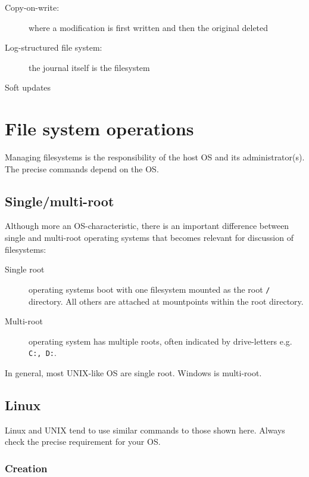 \begin{description}
\item[Copy-on-write:]
where a modification is first written and then the original deleted
\item[Log-structured file system:]
the journal itself is the filesystem
\item[Soft updates]
\end{description}

\section{File system operations}\label{file-system-operations}

Managing filesystems is the responsibility of the host OS and its
administrator(s). The precise commands depend on the OS.

\subsection{Single/multi-root}\label{singlemulti-root}

Although more an OS-characteristic, there is an important difference
between single and multi-root operating systems that becomes relevant
for discussion of filesystems:

\begin{description}
\item[Single root]
operating systems boot with one filesystem mounted as the root
\texttt{/} directory. All others are attached at mountpoints within the
root directory.
\item[Multi-root]
operating system has multiple roots, often indicated by drive-letters
e.g. \texttt{C:,\ D:}.
\end{description}

In general, most UNIX-like OS are single root. Windows is multi-root.

\subsection{Linux}\label{linux}

Linux and UNIX tend to use similar commands to those shown here. Always
check the precise requirement for your OS.

\subsubsection{Creation}\label{creation}

